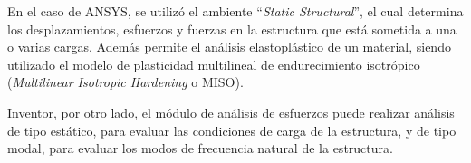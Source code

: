 
En el caso de ANSYS, se utilizó el ambiente ``\textit{Static Structural}'', el cual determina los desplazamientos, esfuerzos y fuerzas en la estructura que está sometida a una o varias cargas. Además permite el análisis elastoplástico de un material, siendo utilizado el modelo de plasticidad multilineal de endurecimiento isotrópico (\textit{Multilinear Isotropic Hardening} o MISO). 

Inventor, por otro lado, el módulo de análisis de esfuerzos puede realizar análisis de tipo estático, para evaluar las condiciones de carga de la estructura, y de tipo modal, para evaluar los modos de frecuencia natural de la estructura.


